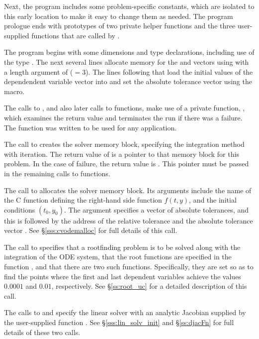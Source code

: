 Next, the program includes some problem-specific constants, which are
isolated to this early location to make it easy to change them as needed.  
The program prologue ends with prototypes of two private helper
functions and the three user-supplied functions that are called by {\cvode}.

The  program begins with some dimensions and type declarations,
including use of the type .  The next several lines
allocate memory for the  and  vectors using
 with a length argument of  ($= 3$). The
lines following that load the initial values of the dependendent
variable vector into  and set the absolute tolerance vector
 using the  macro.

The calls to , and also later calls to 
functions, make use of a private function, , which examines
the return value and terminates the run if there was a failure.  The
 function was written to be used for any 
application.

The call to  creates the {\cvode} solver memory block,
specifying the  integration method with  iteration.
The return value of is a pointer to that memory block for this
problem.  In the case of failure, the return value is .  This
pointer must be passed in the remaining calls to {\cvode} functions.

The call to  allocates the solver memory block.
Its arguments include the name of the C function  defining the
right-hand side function $f(t,y)$, and the initial conditions $(t_0,y_0)$.
The argument  specifies a vector of absolute tolerances, and
this is followed by the address of the relative tolerance 
and the absolute tolerance vector .
See \S\ref{sss:cvodemalloc} for full details of this call.

The call to  specifies that a rootfinding problem
is to be solved along with the integration of the ODE system, that the
root functions are specified in the function , and that there are
two such functions.  Specifically, they are set so as to find the points
where the first and last dependent variables achieve the values $0.0001$
 and $0.01$, respectively.
See \S\ref{ss:root_uc} for a detailed description of this call.

The calls to  and  specify the {\cvdense}
linear solver with an analytic Jacobian supplied by the user-supplied
function .  See \S\ref{sss:lin_solv_init} and \S\ref{ss:djacFn}
for full details of these two calls.

